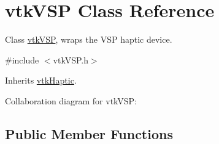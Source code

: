 \hypertarget{classvtkVSP}{
\section{vtkVSP Class Reference}
\label{classvtkVSP}
}


Class \hyperlink{classvtkVSP}{vtkVSP}, wraps the VSP haptic device.  




{\ttfamily \#include $<$vtkVSP.h$>$}



Inherits \hyperlink{classvtkHaptic}{vtkHaptic}.



Collaboration diagram for vtkVSP:\subsection*{Public Member Functions}
